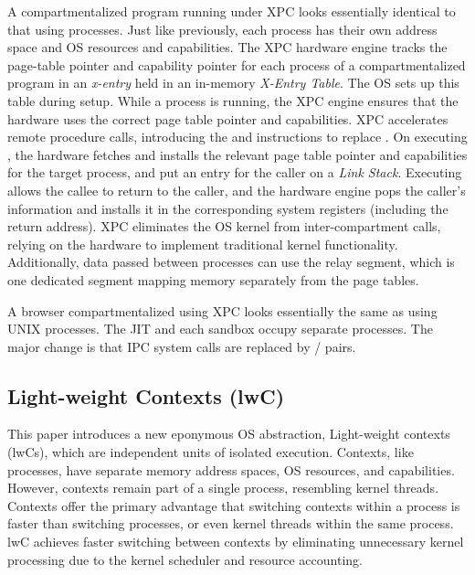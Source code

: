 A compartmentalized program running under XPC looks essentially identical
to that using processes.
Just like previously, each process has their own address space and OS 
resources and capabilities.
The XPC hardware engine tracks the page-table pointer and capability pointer
for each process of a compartmentalized program in an \emph{x-entry} held in
an in-memory \emph{X-Entry Table}.
The OS sets up this table during setup.
While a process is running, the XPC engine ensures that the hardware uses the
correct page table pointer and capabilities.
XPC accelerates remote procedure calls, introducing the  and
 instructions to replace .
On executing , the hardware fetches and installs the relevant 
page table pointer and capabilities for the target process, 
and put an entry for the caller on a \emph{Link Stack}.
Executing  allows the callee to return to the caller, and the
hardware engine pops the caller's information and installs it in the
corresponding system registers (including the return address). 
XPC eliminates the OS kernel from inter-compartment calls, relying on the 
hardware to implement traditional kernel functionality.
Additionally, data passed between processes can use the relay segment, which
is one dedicated segment mapping memory separately from the page tables.

A browser compartmentalized using XPC looks essentially the same as
using UNIX processes. 
The JIT and each sandbox occupy separate processes.
The major change is that IPC system calls are replaced by 
/ pairs.

\subsection{Light-weight Contexts (lwC)}

This paper introduces a new eponymous OS abstraction,
Light-weight contexts (lwCs),
which are independent units of isolated execution.
Contexts, like processes, have separate memory address spaces, OS resources,
and capabilities.
However, contexts remain part of a single process, resembling kernel threads.
Contexts offer the primary advantage that switching contexts within a process is 
faster than switching processes, or even kernel threads within the same process.
lwC achieves faster switching between contexts by eliminating unnecessary kernel
processing due to the kernel scheduler and resource accounting.

